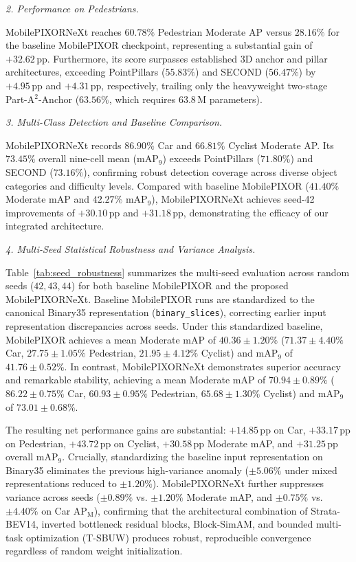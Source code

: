 \textit{2. Performance on Pedestrians.}

MobilePIXORNeXt reaches $60.78\%$ Pedestrian Moderate AP versus $28.16\%$ for the baseline MobilePIXOR checkpoint, representing a substantial gain of $+32.62\,\text{pp}$. Furthermore, its score surpasses established 3D anchor and pillar architectures, exceeding PointPillars ($55.83\%$) and SECOND ($56.47\%$) by $+4.95\,\text{pp}$ and $+4.31\,\text{pp}$, respectively, trailing only the heavyweight two-stage Part-A$^2$-Anchor ($63.56\%$, which requires $63.8\,\text{M}$ parameters).

\textit{3. Multi-Class Detection and Baseline Comparison.}

MobilePIXORNeXt records $86.90\%$ Car and $66.81\%$ Cyclist Moderate AP. Its $73.45\%$ overall nine-cell mean ($\text{mAP}_9$) exceeds PointPillars ($71.80\%$) and SECOND ($73.16\%$), confirming robust detection coverage across diverse object categories and difficulty levels. Compared with baseline MobilePIXOR ($41.40\%$ Moderate mAP and $42.27\%$ $\text{mAP}_9$), MobilePIXORNeXt achieves seed-42 improvements of $+30.10\,\text{pp}$ and $+31.18\,\text{pp}$, demonstrating the efficacy of our integrated architecture.

\textit{4. Multi-Seed Statistical Robustness and Variance Analysis.}

Table~\ref{tab:seed_robustness} summarizes the multi-seed evaluation across random seeds ($42, 43, 44$) for both baseline MobilePIXOR and the proposed MobilePIXORNeXt. Baseline MobilePIXOR runs are standardized to the canonical Binary35 representation (\texttt{binary\_slices}), correcting earlier input representation discrepancies across seeds. Under this standardized baseline, MobilePIXOR achieves a mean Moderate mAP of $40.36\pm1.20\%$ ($71.37\pm4.40\%$ Car, $27.75\pm1.05\%$ Pedestrian, $21.95\pm4.12\%$ Cyclist) and $\text{mAP}_9$ of $41.76\pm0.52\%$. In contrast, MobilePIXORNeXt demonstrates superior accuracy and remarkable stability, achieving a mean Moderate mAP of $70.94\pm0.89\%$ ($86.22\pm0.75\%$ Car, $60.93\pm0.95\%$ Pedestrian, $65.68\pm1.30\%$ Cyclist) and $\text{mAP}_9$ of $73.01\pm0.68\%$. 

The resulting net performance gains are substantial: $+14.85\,\text{pp}$ on Car, $+33.17\,\text{pp}$ on Pedestrian, $+43.72\,\text{pp}$ on Cyclist, $+30.58\,\text{pp}$ Moderate mAP, and $+31.25\,\text{pp}$ overall $\text{mAP}_9$. Crucially, standardizing the baseline input representation on Binary35 eliminates the previous high-variance anomaly ($\pm 5.06\%$ under mixed representations reduced to $\pm 1.20\%$). MobilePIXORNeXt further suppresses variance across seeds ($\pm 0.89\%$ vs. $\pm 1.20\%$ Moderate mAP, and $\pm 0.75\%$ vs. $\pm 4.40\%$ on Car AP$_{\mathrm{M}}$), confirming that the architectural combination of Strata-BEV14, inverted bottleneck residual blocks, Block-SimAM, and bounded multi-task optimization (T-SBUW) produces robust, reproducible convergence regardless of random weight initialization.

